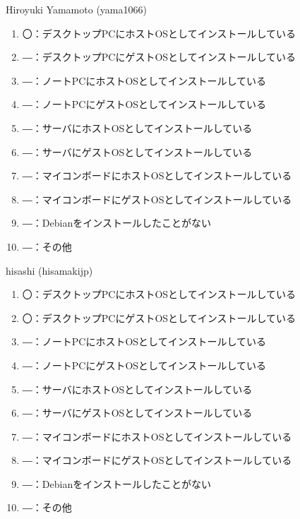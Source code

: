 \begin{prework}{ Hiroyuki Yamamoto (yama1066) }
  \begin{enumerate}
  \item 〇：デスクトップPCにホストOSとしてインストールしている
  \item ―：デスクトップPCにゲストOSとしてインストールしている
  \item ―：ノートPCにホストOSとしてインストールしている
  \item ―：ノートPCにゲストOSとしてインストールしている
  \item ―：サーバにホストOSとしてインストールしている
  \item ―：サーバにゲストOSとしてインストールしている
  \item ―：マイコンボードにホストOSとしてインストールしている
  \item ―：マイコンボードにゲストOSとしてインストールしている
  \item ―：Debianをインストールしたことがない
  \item ―：その他
  \end{enumerate}
\end{prework}

\begin{prework}{ hisashi (hisamakijp) }
  \begin{enumerate}
  \item 〇：デスクトップPCにホストOSとしてインストールしている
  \item 〇：デスクトップPCにゲストOSとしてインストールしている
  \item ―：ノートPCにホストOSとしてインストールしている
  \item ―：ノートPCにゲストOSとしてインストールしている
  \item ―：サーバにホストOSとしてインストールしている
  \item ―：サーバにゲストOSとしてインストールしている
  \item ―：マイコンボードにホストOSとしてインストールしている
  \item ―：マイコンボードにゲストOSとしてインストールしている
  \item ―：Debianをインストールしたことがない
  \item ―：その他
  \end{enumerate}
\end{prework}
